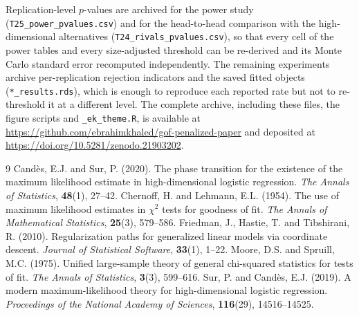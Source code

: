 \documentclass[11pt,a4paper]{article}
\theoremstyle{plain}
\theoremstyle{remark}
\begin{document}
Replication-level $p$-values are archived for the power study
(\texttt{T25\_power\_pvalues.csv}) and for the head-to-head comparison with the
high-dimensional alternatives (\texttt{T24\_rivals\_pvalues.csv}), so that every cell of
the power tables and every size-adjusted threshold can be re-derived and its Monte Carlo
standard error recomputed independently. The remaining experiments archive
per-replication rejection indicators and the saved fitted objects
(\texttt{*\_results.rds}), which is enough to reproduce each reported rate but not to
re-threshold it at a different level. The complete archive, including these files, the
figure scripts and \texttt{\_ek\_theme.R}, is available at
\url{https://github.com/ebrahimkhaled/gof-penalized-paper} and deposited at
\url{https://doi.org/10.5281/zenodo.21903202}.


\begin{thebibliography}{9}
Cand\`es, E.J. and Sur, P. (2020). The phase transition for the existence of the maximum
likelihood estimate in high-dimensional logistic regression. \emph{The Annals of
Statistics}, \textbf{48}(1), 27--42.
Chernoff, H. and Lehmann, E.L. (1954). The use of maximum likelihood estimates in
$\chi^2$ tests for goodness of fit. \emph{The Annals of Mathematical Statistics},
\textbf{25}(3), 579--586.
Friedman, J., Hastie, T. and Tibshirani, R. (2010). Regularization paths for generalized
linear models via coordinate descent. \emph{Journal of Statistical Software},
\textbf{33}(1), 1--22.
Moore, D.S. and Spruill, M.C. (1975). Unified large-sample theory of general chi-squared
statistics for tests of fit. \emph{The Annals of Statistics}, \textbf{3}(3), 599--616.
Sur, P. and Cand\`es, E.J. (2019). A modern maximum-likelihood theory for
high-dimensional logistic regression. \emph{Proceedings of the National Academy of
Sciences}, \textbf{116}(29), 14516--14525.
\end{thebibliography}
\end{document}
